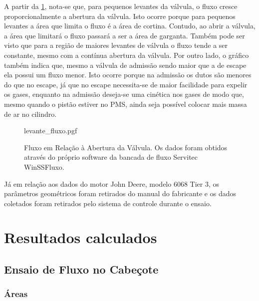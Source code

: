 %
A partir da \cref{fig:fluxo_levante}, nota-se que, para pequenos levantes da válvula, o fluxo cresce proporcionalmente a abertura da válvula. 
Isto ocorre porque para pequenos levantes a área que limita o fluxo é a área de cortina. 
Contudo, ao abrir a válvula, a área que limitará o fluxo passará a ser a área de garganta.
Também pode ser visto que para a região de maiores levantes de válvula o fluxo tende a ser constante, mesmo com a contínua abertura da válvula.
Por outro lado, o gráfico também indica que, mesmo a válvula de admissão sendo maior que a de escape ela possui um fluxo menor. Isto ocorre porque na admissão os dutos são menores do que no escape, já que no escape necessita-se de maior facilidade para expelir os gases, enquanto na admissão deseja-se uma cinética nos gases de modo que, mesmo quando o pistão estiver no PMS, ainda seja possível colocar mais massa de ar no cilindro.
%
\begin{figure}[!htb]
    \centering
    \caption[Fluxo em Relação à Abertura da Válvula]{Fluxo em Relação à Abertura da Válvula. Os dados foram obtidos através do próprio software da bancada de fluxo Servitec WinSSFluxo.}
    {levante_fluxo.pgf}
    \label{fig:fluxo_levante}
\end{figure}
%

Já em relação aos dados do motor John Deere, modelo 6068 Tier 3, os parâmetros geométricos foram retirados do manual do fabricante e os dados coletados foram retirados pelo sistema de controle durante o ensaio.

\section{Resultados calculados}

\subsection{Ensaio de Fluxo no Cabeçote}

\subsubsection*{Áreas}

